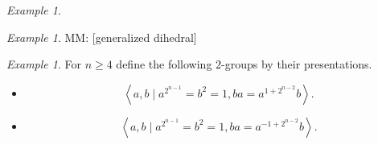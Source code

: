 \documentclass{dcthesis}
\newcommand{\mm}[1]{{\color{blue} \sf MM: [#1]}}
\theoremstyle{definition}
\theoremstyle{remark}
\newtheorem{example}[prop]{Example}
\numberwithin{equation}{section}
\numberwithin{figure}{section}
\begin{document}
{{\begin{example}
\begin{itemize}
      \end{itemize}
    \end{example}
    \begin{example}
      \label{exm:generalizeddihedral}
      \mm{generalized dihedral}
    \end{example}
    \begin{example}
      \label{exm:randomtwogroups}
      For $n\geq 4$ define
      the following $2$-groups by their presentations.
      \begin{itemize}
        \item
          \[
            \left\langle
              a,b\mid
              a^{2^{n-1}}=b^2=1,
              ba=a^{1+2^{n-2}}b
            \right\rangle.
          \]
        \item
          \[
            \left\langle
              a,b\mid
              a^{2^{n-1}}=b^2=1,
              ba=a^{-1+2^{n-2}}b
            \right\rangle.
          \]
      \end{itemize}
    \end{example}
  }
}
\end{document}
